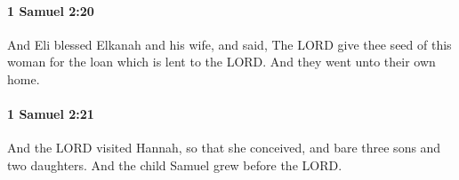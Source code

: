		\paragraph{1 Samuel 2:20} %
			\label{1SAMUEL-2-20}

			And Eli blessed Elkanah and his wife, and said, The LORD give thee seed of this woman for the loan which is lent to the LORD. And they went unto their own home.


		\paragraph{1 Samuel 2:21} %
			\label{1SAMUEL-2-21}

			And the LORD visited Hannah, so that she conceived, and bare three sons and two daughters. And the child Samuel grew before the LORD.


